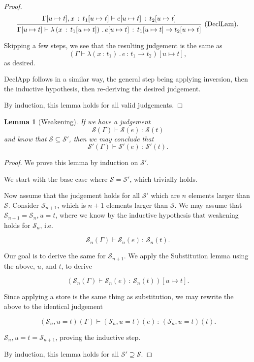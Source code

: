 \documentclass{article}
\newtheorem{lemma}{Lemma}
\newcommand{\G}{\Gamma}
\newcommand{\St}{\mathcal{S}}
\newcommand{\tp}{t}
\newcommand{\uv}{u}
\newcommand{\e}{e}
\newcommand{\x}{x}
\newcommand{\withtp}[2]{{#1} \,:\, {#2}}
\newcommand{\lamtp}[3]{\lambda \left( {\withtp {#1} {#2}} \right) \,.\, {#3}}
\newcommand{\arr}[2]{{#1} \to {#2}}
\newcommand{\hastp}[3]{#1 \vdash {\withtp {#2} {#3}}}
\newcommand{\deduct}[3][]
{
  \begin{prooftree}
    \hypo{#2}
    \infer1[\text{#1}]{#3}
  \end{prooftree}
}
\begin{document}
\begin{proof}
  \[
    \deduct
    {\hastp {\G[\uv \mapsto \tp], {\withtp \x {\tp_1[\uv \mapsto \tp]}}} {\e[\uv
  \mapsto \tp]}{\tp_2[\uv \mapsto \tp]}}
    {\hastp {\G[\uv \mapsto \tp]} {\lamtp {\x} {\tp_1[\uv \mapsto \tp]} {\e[\uv
    \mapsto \tp]}} {\arr {\tp_1[\uv \mapsto \tp]} {\tp_2[\uv \mapsto \tp]}}}
    {\text{(DeclLam)}}.
  \]

  Skipping a few steps, we see that the resulting judgement is the same as
  \[ \left(\hastp \G {\lamtp {\x} {\tp_1} {\e}} {\arr {\tp_1}
  {\tp_2}}\right)[\uv \mapsto \tp], \]
  as desired.

  DeclApp follows in a similar way, the general step being applying inversion,
  then the inductive hypothesis, then re-deriving the desired judgement.

  By induction, this lemma holds for all valid judgements.

\end{proof}

\begin{lemma}[Weakening]
  If we have a judgement
  \[\hastp {\St(\G)} {\St(\e)} {\St(\tp)}\]
  and know that \(\St \subseteq \St'\), then we may conclude that
  \[\hastp {\St'(\G)} {\St'(\e)} {\St'(\tp)}.\]
\end{lemma}

\begin{proof}
  We prove this lemma by induction on \(\St'\).

  We start with the base case where \(\St = \St'\), which trivially holds.

  Now assume that the judgement holds for all \(\St'\) which are \(n\) elements
  larger than \(\St\). Consider \(\St_{n+1}\), which is \(n+1\) elements larger
  than \(\St\). We may assume that \(\St_{n+1} = \St_n, \uv = \tp\), where we
  know by the inductive hypothesis that weakening holds for \(\St_n\), i.e.

  \[\hastp {\St_n(\G)} {\St_n(\e)} {\St_n(\tp)}.\]

  Our goal is to derive the same for \(\St_{n+1}\). We apply the Substitution
  lemma using the above, \(\uv\), and \(\tp\), to derive

  \[\left(\hastp {\St_n(\G)} {\St_n(\e)} {\St_n(\tp)}\right)[\uv \mapsto \tp].\]

  Since applying a store is the same thing as substitution, we may rewrite the
  above to the identical judgement

  \[\hastp {(\St_n, \uv = \tp)(\G)} {(\St_n, \uv = \tp)(\e)} {(\St_n, \uv = \tp)(\tp)}.\]

  \(\St_n, \uv = \tp = \St_{n+1}\), proving the inductive step.

  By induction, this lemma holds for all \(\St' \supseteq \St\).
\end{proof}
\end{document}
